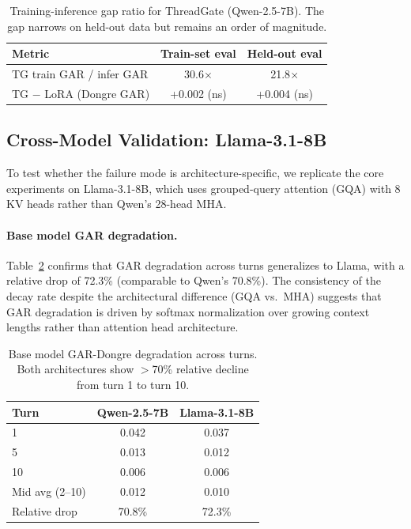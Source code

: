 \documentclass[11pt,a4paper]{article}
\begin{document}
\begin{table}[t]
\centering
\caption{Training-inference gap ratio for ThreadGate (Qwen-2.5-7B). The gap narrows on held-out data but remains an order of magnitude.}
\label{tab:gap_ratio}
\small
\begin{tabular}{lcc}
\toprule
\textbf{Metric} & \textbf{Train-set eval} & \textbf{Held-out eval} \\
\midrule
TG train GAR / infer GAR & 30.6$\times$ & 21.8$\times$ \\
TG $-$ LoRA (Dongre GAR) & +0.002 (ns) & +0.004 (ns) \\
\bottomrule
\end{tabular}
\end{table}

\subsection{Cross-Model Validation: Llama-3.1-8B}

To test whether the failure mode is architecture-specific, we replicate the core experiments on Llama-3.1-8B, which uses grouped-query attention (GQA) with 8 KV heads rather than Qwen's 28-head MHA.

\paragraph{Base model GAR degradation.} Table~\ref{tab:base_gar} confirms that GAR degradation across turns generalizes to Llama, with a relative drop of 72.3\% (comparable to Qwen's 70.8\%). The consistency of the decay rate despite the architectural difference (GQA vs.\ MHA) suggests that GAR degradation is driven by softmax normalization over growing context lengths rather than attention head architecture.

\begin{table}[t]
\centering
\caption{Base model GAR-Dongre degradation across turns. Both architectures show $>$70\% relative decline from turn 1 to turn 10.}
\label{tab:base_gar}
\small
\begin{tabular}{lcc}
\toprule
\textbf{Turn} & \textbf{Qwen-2.5-7B} & \textbf{Llama-3.1-8B} \\
\midrule
1 & 0.042 & 0.037 \\
5 & 0.013 & 0.012 \\
10 & 0.006 & 0.006 \\
\midrule
Mid avg (2--10) & 0.012 & 0.010 \\
Relative drop & 70.8\% & 72.3\% \\
\bottomrule
\end{tabular}
\end{table}
\end{document}
